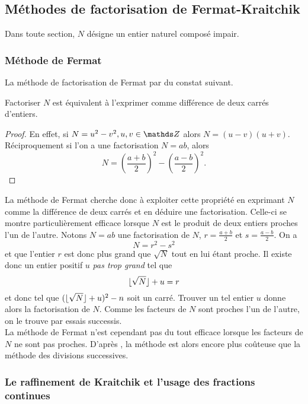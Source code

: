\subsection{Méthodes de factorisation de Fermat-Kraitchik}

Dans toute section, $N$ désigne un entier naturel composé impair.

\subsubsection{Méthode de Fermat}

La méthode de factorisation de Fermat par du constat suivant.

\begin{lemme}
	Factoriser $N$ est équivalent à l'exprimer comme différence de deux carrés
	d'entiers.
\end{lemme}

\begin{proof}
	En effet, si $N = u^2 - v^2, u, v\in \Z$ alors $N = (u-v)(u + v)$.
	Réciproquement si l'on a une factorisation $N = ab$, alors \[N =
	\left(\frac{a+b}{2}\right)^2 - \left(\frac{a-b}{2}\right)^2.\]
\end{proof}

La méthode de Fermat cherche donc à exploiter cette propriété en exprimant $N$
comme la différence de deux carrés et en déduire une factorisation. Celle-ci se
montre particulièrement efficace lorsque $N$ est le produit de deux entiers
proches l'un de l'autre. Notons $N=ab$ une factorisation de $N$,
$r=\frac{a+b}{2}$ et $s=\frac{a-b}{2}$. On a \[N = r^2 - s^2\] et que l'entier
$r$ est donc plus grand que $\sqrt{N}$ tout en lui étant proche. Il existe donc
un entier positif $u$ \emph{pas trop grand} tel que \[\lfloor\sqrt{N}\rfloor + u = r\]
et donc tel que $(\lfloor\sqrt{N}\rfloor + u)^2 - n$ soit un carré. Trouver un tel
entier $u$ donne alors la factorisation de $N$. Comme les facteurs de $N$ sont
proches l'un de l'autre, on le trouve par essais successis. \\

La méthode de Fermat n'est cependant pas du tout efficace lorsque les facteurs
de $N$ ne sont pas proches. D'après , la méthode est alors encore plus
coûteuse que la méthode des divisions successives.

\subsubsection{Le raffinement de Kraitchik et l'usage des fractions continues}
